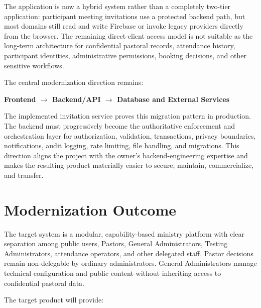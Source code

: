 \documentclass[11pt,a4paper,oneside]{report}
\begin{document}
\begin{criticalbox}
The application is now a hybrid system rather than a completely two-tier application: participant meeting invitations use a protected backend path, but most domains still read and write Firebase or invoke legacy providers directly from the browser. The remaining direct-client access model is not suitable as the long-term architecture for confidential pastoral records, attendance history, participant identities, administrative permissions, booking decisions, and other sensitive workflows.
\end{criticalbox}

The central modernization direction remains:

\begin{center}
\textbf{Frontend $\rightarrow$ Backend/API $\rightarrow$ Database and External Services}
\end{center}

The implemented invitation service proves this migration pattern in production. The backend must progressively become the authoritative enforcement and orchestration layer for authorization, validation, transactions, privacy boundaries, notifications, audit logging, rate limiting, file handling, and migrations. This direction aligns the project with the owner's backend-engineering expertise and makes the resulting product materially easier to secure, maintain, commercialize, and transfer.

\section{Modernization Outcome}

The target system is a modular, capability-based ministry platform with clear separation among public users, Pastors, General Administrators, Testing Administrators, attendance operators, and other delegated staff. Pastor decisions remain non-delegable by ordinary administrators. General Administrators manage technical configuration and public content without inheriting access to confidential pastoral data.

The target product will provide:
\end{document}
